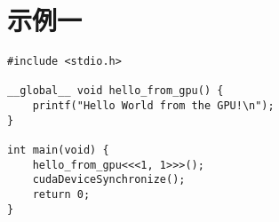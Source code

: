 \documentclass{ctexart}
\begin{document}
\section{示例一}
\begin{verbatim}
#include <stdio.h>

__global__ void hello_from_gpu() {
    printf("Hello World from the GPU!\n");
}

int main(void) {
    hello_from_gpu<<<1, 1>>>();
    cudaDeviceSynchronize();
    return 0;
}
\end{verbatim}

\inputminted[linenos=true,frame=single,breaklines]{c}{main.cu}
\end{document}

